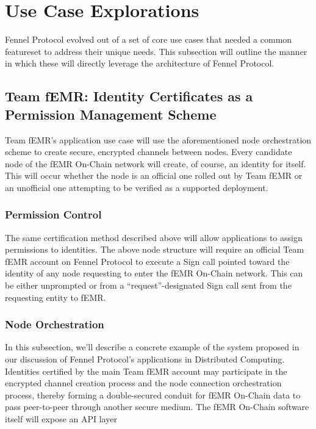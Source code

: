 \documentclass[]{article}
\begin{document}
\section{Use Case Explorations}
\label{scrivauto:32}

Fennel Protocol evolved out of a set of core use cases that needed a common featureset to address their unique needs. This subsection will outline the manner in which these will directly leverage the architecture of Fennel Protocol.

\subsection{Team fEMR: Identity Certificates as a Permission Management Scheme}
\label{scrivauto:33}

Team fEMR's application use case will use the aforementioned node orchestration scheme to create secure, encrypted channels between nodes. Every candidate node of the fEMR On-Chain network will create, of course, an identity for itself. This will occur whether the node is an official one rolled out by Team fEMR or an unofficial one attempting to be verified as a supported deployment.

\subsubsection{Permission Control}
\label{scrivauto:34}

The same certification method described above will allow applications to assign permissions to identities. The above node structure will require an official Team fEMR account on Fennel Protocol to execute a Sign call pointed toward the identity of any node requesting to enter the fEMR On-Chain network. This can be either unprompted or from a ``request''-designated Sign call sent from the requesting entity to fEMR.

\subsubsection{Node Orchestration}
\label{scrivauto:35}

In this subsection, we'll describe a concrete example of the system proposed in our discussion of Fennel Protocol's applications in Distributed Computing. Identities certified by the main Team fEMR account may participate in the encrypted channel creation process and the node connection orchestration process, thereby forming a double-secured conduit for fEMR On-Chain data to pass peer-to-peer through another secure medium. The fEMR On-Chain software itself will expose an API layer 
\end{document}
